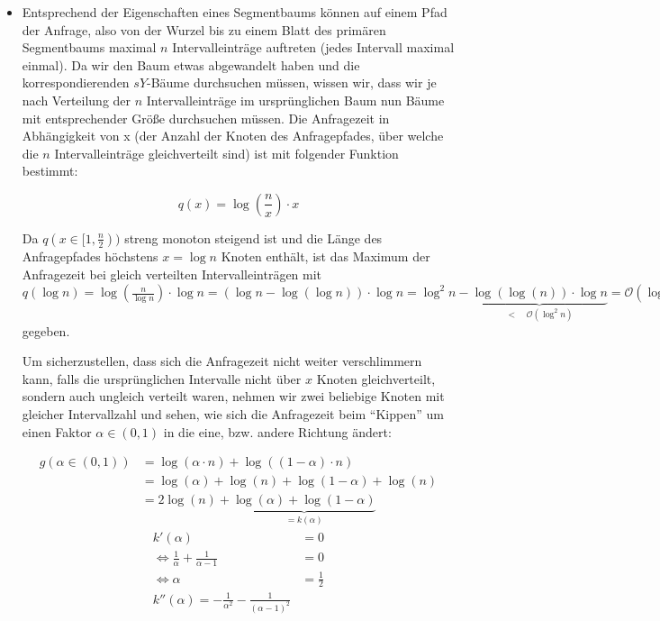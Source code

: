 \documentclass[a4paper]{article}
\begin{document}
\begin{itemize}
	\item Entsprechend der Eigenschaften eines Segmentbaums können auf einem Pfad der Anfrage,
	also von der Wurzel bis zu einem Blatt des primären Segmentbaums maximal $n$ Intervalleinträge
	auftreten (jedes Intervall maximal einmal). Da wir den Baum etwas abgewandelt haben und 
	die korrespondierenden $sY$-Bäume durchsuchen müssen, wissen wir, dass wir je nach Verteilung
	der $n$ Intervalleinträge im ursprünglichen Baum nun Bäume mit entsprechender Größe durchsuchen müssen. Die Anfragezeit in Abhängigkeit von x (der Anzahl der Knoten des Anfragepfades, über welche die $n$ Intervalleinträge gleichverteilt sind) ist mit folgender Funktion bestimmt:
	
	$$q(x) = \log(\frac{n}{x}) \cdot x$$
	
	Da $q(x \in [1,\frac{n}{2}))$ streng monoton steigend ist und die Länge des Anfragepfades
	höchstens $x = \log n$ Knoten enthält, ist das Maximum der Anfragezeit bei gleich verteilten
	Intervalleinträgen mit $q(\log n) = \log(\frac{n}{\log n}) \cdot \log n = 
	(\log n - \log(\log n)) \cdot \log n = \log^2 n - 
	\underbrace{\log(\log(n)) \cdot \log n}_{< \quad \mathcal{O}(\log^2 n)} = \mathcal{O}(\log^2 n)$ gegeben.
	
	Um sicherzustellen, dass sich die Anfragezeit nicht weiter verschlimmern kann, falls
	die ursprünglichen Intervalle nicht über $x$ Knoten gleichverteilt, sondern auch ungleich
	verteilt waren, nehmen wir zwei beliebige Knoten mit gleicher Intervallzahl und sehen, 
	wie sich die Anfragezeit beim "`Kippen"' um einen Faktor $\alpha \in (0,1)$ in die eine, bzw. andere Richtung ändert:
	
	\begin{align*}
	g(\alpha \in (0,1)) &= \log (\alpha \cdot n) + \log((1-\alpha) \cdot n) \\
						&= \log (\alpha) + \log(n) + \log (1-\alpha) + \log (n) \\
						&= 2\log (n) + \underbrace{\log(\alpha) + \log (1-\alpha)}_{= k(\alpha)}						
	\end{align*}
	\begin{align*}
	k'(\alpha) &= 0\\
	\Leftrightarrow \frac{1}{\alpha} + \frac{1}{\alpha - 1} &= 0\\	 
	\Leftrightarrow \alpha &= \frac{1}{2}\\
	k''(\alpha) = -\frac{1}{\alpha^2} - \frac{1}{(\alpha-1)^2}
	\end{align*}
	

\end{itemize}
\end{document}
